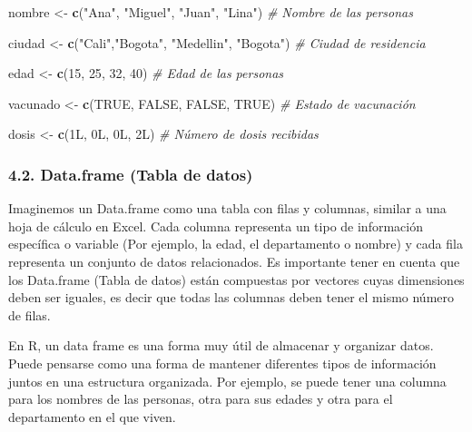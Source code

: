 \documentclass[
]{article}
\newenvironment{Shaded}{\begin{snugshade}}{\end{snugshade}}
\newcommand{\CommentTok}[1]{\textcolor[rgb]{0.56,0.35,0.01}{\textit{#1}}}
\newcommand{\ConstantTok}[1]{\textcolor[rgb]{0.56,0.35,0.01}{#1}}
\newcommand{\DataTypeTok}[1]{\textcolor[rgb]{0.13,0.29,0.53}{#1}}
\newcommand{\DecValTok}[1]{\textcolor[rgb]{0.00,0.00,0.81}{#1}}
\newcommand{\FunctionTok}[1]{\textcolor[rgb]{0.13,0.29,0.53}{\textbf{#1}}}
\newcommand{\NormalTok}[1]{#1}
\newcommand{\OtherTok}[1]{\textcolor[rgb]{0.56,0.35,0.01}{#1}}
\newcommand{\StringTok}[1]{\textcolor[rgb]{0.31,0.60,0.02}{#1}}
\begin{document}
\begin{Shaded}
\begin{Highlighting}[]
\NormalTok{nombre }\OtherTok{\textless{}{-}} \FunctionTok{c}\NormalTok{(}\StringTok{"Ana"}\NormalTok{, }\StringTok{"Miguel"}\NormalTok{, }\StringTok{"Juan"}\NormalTok{, }\StringTok{"Lina"}\NormalTok{) }\CommentTok{\# Nombre de las personas}

\NormalTok{ciudad }\OtherTok{\textless{}{-}} \FunctionTok{c}\NormalTok{(}\StringTok{"Cali"}\NormalTok{,}\StringTok{"Bogota"}\NormalTok{, }\StringTok{"Medellin"}\NormalTok{, }\StringTok{"Bogota"}\NormalTok{) }\CommentTok{\# Ciudad de residencia}

\NormalTok{edad }\OtherTok{\textless{}{-}} \FunctionTok{c}\NormalTok{(}\DecValTok{15}\NormalTok{, }\DecValTok{25}\NormalTok{, }\DecValTok{32}\NormalTok{, }\DecValTok{40}\NormalTok{)  }\CommentTok{\# Edad de las personas}

\NormalTok{vacunado }\OtherTok{\textless{}{-}} \FunctionTok{c}\NormalTok{(}\ConstantTok{TRUE}\NormalTok{, }\ConstantTok{FALSE}\NormalTok{, }\ConstantTok{FALSE}\NormalTok{, }\ConstantTok{TRUE}\NormalTok{) }\CommentTok{\# Estado de vacunación}

\NormalTok{dosis }\OtherTok{\textless{}{-}} \FunctionTok{c}\NormalTok{(}\DecValTok{1}\DataTypeTok{L}\NormalTok{, }\DecValTok{0}\DataTypeTok{L}\NormalTok{, }\DecValTok{0}\DataTypeTok{L}\NormalTok{, }\DecValTok{2}\DataTypeTok{L}\NormalTok{) }\CommentTok{\# Número de dosis recibidas}
\end{Highlighting}
\end{Shaded}

\subsubsection{4.2. Data.frame (Tabla de
datos)}\label{data.frame-tabla-de-datos}

Imaginemos un Data.frame como una tabla con filas y columnas, similar a
una hoja de cálculo en Excel. Cada columna representa un tipo de
información específica o variable (Por ejemplo, la edad, el departamento
o nombre) y cada fila representa un conjunto de datos relacionados. Es
importante tener en cuenta que los Data.frame (Tabla de datos) están
compuestas por vectores cuyas dimensiones deben ser iguales, es decir
que todas las columnas deben tener el mismo número de filas.

En R, un data frame es una forma muy útil de almacenar y organizar
datos. Puede pensarse como una forma de mantener diferentes tipos de
información juntos en una estructura organizada. Por ejemplo, se puede
tener una columna para los nombres de las personas, otra para sus edades
y otra para el departamento en el que viven.
\end{document}

